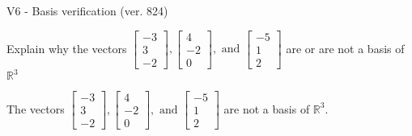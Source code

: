\begin{exercise}
  \begin{exerciseTitle}V6 - Basis verification (ver. 824)\end{exerciseTitle}
  \begin{exerciseStatement}
    Explain why the vectors \(\left[\begin{array}{r}
-3 \\
3 \\
-2
\end{array}\right] , \left[\begin{array}{r}
4 \\
-2 \\
0
\end{array}\right] , \text{ and } \left[\begin{array}{r}
-5 \\
1 \\
2
\end{array}\right]\) are or are not a basis of \(\mathbb{R}^3\)	


  \end{exerciseStatement}
  \begin{exerciseAnswer}
   The vectors \(\left[\begin{array}{r}
-3 \\
3 \\
-2
\end{array}\right] , \left[\begin{array}{r}
4 \\
-2 \\
0
\end{array}\right] , \text{ and } \left[\begin{array}{r}
-5 \\
1 \\
2
\end{array}\right]\) 
  	 are not  a basis of \(\mathbb{R}^3\).
  


  \end{exerciseAnswer}
\end{exercise}